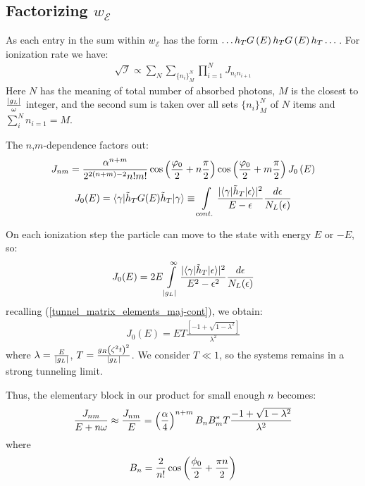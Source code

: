 \subsection{Factorizing $ w_\mathcal{E} $}
As each entry in the sum within $ w_{\mathcal{E}} $ has the form $ \dots h_TG\left(E\right)h_TG\left(E\right)h_T\dots $.  For ionization rate we have:
\begin{gather}
	\sqrt{\mathcal{I}}\propto
	\sum_N \sum_{\{n_i\}_M^N}\prod_{i=1}^{N}J_{n_in_{i+1}}
\end{gather}
Here $ N $ has the meaning of total number of absorbed photons, $ M $ is the closest to $ \frac{\left|g_L\right|}{\omega }$ integer, and the second sum is taken over all sets $ \{n_i\}_M^N $ of $ N $ items and $ \sum_i^N n_{i=1} = M$.

 The $ n $,$ m $-dependence factors out:
\begin{gather}
J_{nm}
=
	\frac{\alpha^{n+m}}
	{2^{2\left(n+m\right)-2}n!m!}
	\cos\left(\frac{\varphi_{0}}{2}+n\frac{\pi}{2}\right)
	\cos\left(\frac{\varphi_{0}}{2}+m\frac{\pi}{2}\right)
	J_0\left(E\right)
\end{gather}
\begin{gather}
	J_{0}(E)
	=
	\langle\gamma|\tilde{h}_{T}G(E)\tilde{h}_{T}|\gamma\rangle
	\equiv
	\intop_{cont.}\frac{|\langle\gamma|\tilde{h}_{T}|\epsilon\rangle|^{2}}{E-\epsilon}\frac{d\epsilon}{N_L(\epsilon)}
\end{gather}

On each ionization step  the particle can move to the state with energy $ E $ or $ -E $, so:
\begin{gather}
	J_{0}(E)
	=
	2E\intop_{|g_{L}|}^{\infty}\frac{|\langle\gamma|\tilde{h}_{T}|\epsilon\rangle|^{2}}{E^{2}-\epsilon^{2}}\frac{d\epsilon}{N_L(\epsilon)}
\end{gather}
recalling (\ref{tunnel_matrix_elements_maj-cont}), we obtain:
\begin{gather}
		J_{0}(E)
		=
		ET\frac{\left[-1+\sqrt{1-\lambda^{2}}\right]}{\lambda^{2}}
\end{gather}
where $ \lambda = \frac{E}{\left|g_L\right|} $, $ T=\frac{g_R\left(\zeta^2t\right)^2}{\left|g_L\right|} $. We consider $ T\ll 1$, so the systems remains in a strong tunneling limit.

Thus, the elementary block  in our product for small enough $ n $ becomes:
\begin{gather}
	\frac{J_{nm}}{E+n\omega}
	\approx
	\frac{J_{nm}}{E}
	=
	\left(\frac{\alpha}{4}\right)^{n+m}
	B_n B_m^* T
	\frac{-1+\sqrt{1-\lambda^2}}{\lambda^2}
\end{gather}
where
\begin{gather}
	B_n=
	\frac{2}{n!}\cos\left(\frac{\phi_0}{2}+\frac{\pi n}{2}\right)
\end{gather}

